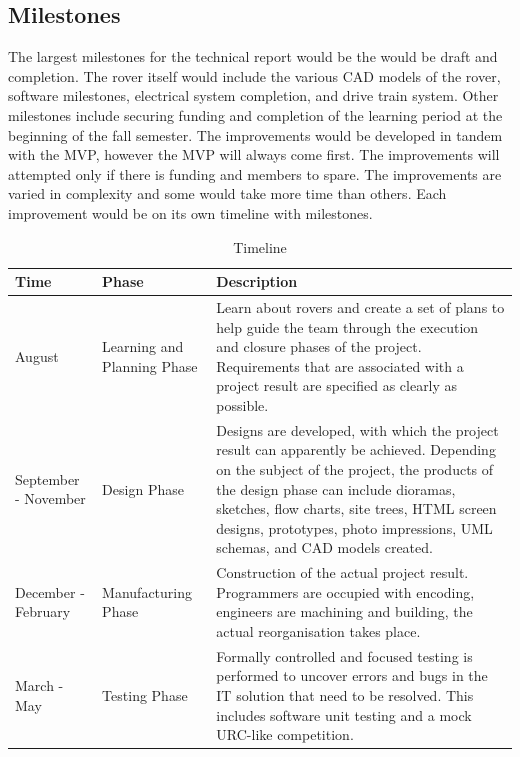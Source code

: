 \documentclass[conference]{IEEEtran} %
\begin{document}
\subsection{Milestones}
\label{subsec:milestones}
The largest milestones for the technical report would be the would be draft and completion. 
The rover itself would include the various CAD models of the rover, software milestones, electrical system completion, and drive train system. 
Other milestones include securing funding and completion of the learning period at the beginning of the fall semester.
The improvements would be developed in tandem with the MVP, however the MVP will always come first. 
The improvements will attempted only if there is funding and members to spare. 
The improvements are varied in complexity and some would take more time than others. 
Each improvement would be on its own timeline with milestones.

\begin{table}[ht!]
    \caption{Timeline}
    \centering
    {\renewcommand{\arraystretch}{1.5}
    \begin{tabularx}{\linewidth}{LLL} 
    \hline
    \textbf{Time} & \textbf{Phase} & \textbf{Description} \\
    \hline
    August & Learning and Planning Phase & Learn about rovers and create a set of plans to help guide the team through the execution and closure phases of the project. Requirements that are associated with a project result are specified as clearly as possible.\\
    September - November & Design Phase &  Designs are developed, with which the project result can apparently be achieved. Depending on the subject of the project, the products of the design phase can include dioramas, sketches, flow charts, site trees, HTML screen designs, prototypes, photo impressions, UML schemas, and CAD models created. \\
    December - February & Manufacturing Phase & Construction of the actual project result. Programmers are occupied with encoding, engineers are machining and building, the actual reorganisation takes place. \\
    March - May & Testing Phase & Formally controlled and focused testing is performed to uncover errors and bugs in the IT solution that need to be resolved. This includes software unit testing and a mock URC-like competition. \\
    \hline
    \end{tabularx}
    }
\label{tab:timeline}
\end{table}
\end{document}
